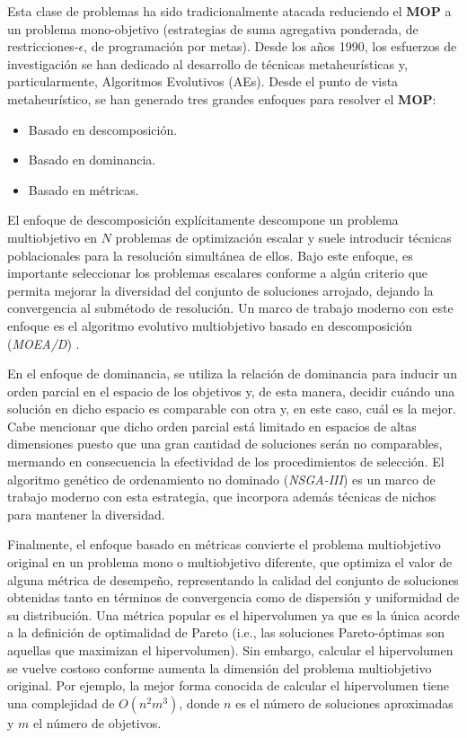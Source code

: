 \documentclass[letterpaper,10pt]{article}
\begin{document}
Esta clase de problemas ha sido tradicionalmente atacada reduciendo el \textbf{MOP} a un problema mono-objetivo (estrategias de suma agregativa ponderada, de restricciones-$\epsilon$,
de programación por metas). Desde los años 1990, los esfuerzos de investigación se han dedicado al desarrollo de técnicas metaheurísticas y, particularmente, Algoritmos Evolutivos (AEs).
Desde el punto de vista metaheurístico, se han generado tres grandes enfoques para resolver el \textbf{MOP}:

\begin{itemize}
 \item Basado en descomposición.
 \item Basado en dominancia.
 \item Basado en métricas.
\end{itemize}

El enfoque de descomposición explícitamente descompone un problema multiobjetivo en $N$ problemas de optimización escalar y suele introducir técnicas poblacionales para
la resolución simultánea de ellos. Bajo este enfoque, es importante seleccionar los problemas escalares conforme a algún criterio que permita mejorar la diversidad del conjunto
de soluciones arrojado, dejando la convergencia al submétodo de resolución. Un marco de trabajo moderno con este enfoque es el algoritmo evolutivo multiobjetivo basado en
descomposición (\emph{MOEA/D}) \cite{4358754}.
\newline

En el enfoque de dominancia, se utiliza la relación de dominancia para inducir un orden parcial en el espacio de los objetivos y, de esta manera, decidir cuándo una solución
en dicho espacio es comparable con otra y, en este caso, cuál es la mejor. Cabe mencionar que dicho orden parcial está limitado en espacios de altas dimensiones puesto que una gran
cantidad de soluciones serán no comparables, mermando en consecuencia la efectividad de los procedimientos de selección. El algoritmo genético de ordenamiento no dominado
(\emph{NSGA-III}) \cite{6600851} es un marco de trabajo moderno con esta estrategia, que incorpora además técnicas de nichos para mantener la diversidad.
\newline

Finalmente, el enfoque basado en métricas convierte el problema multiobjetivo original en un problema mono o multiobjetivo diferente, que optimiza el valor de alguna métrica de desempeño,
representando la calidad del conjunto de soluciones obtenidas tanto en términos de convergencia como de dispersión y uniformidad de su distribución. Una métrica popular
es el hipervolumen ya que es la única acorde a la definición de  optimalidad de Pareto (i.e., las soluciones Pareto-óptimas son aquellas que maximizan el hipervolumen).
Sin embargo, calcular el hipervolumen se vuelve costoso conforme aumenta la dimensión del problema multiobjetivo original. Por ejemplo, la mejor forma conocida de calcular
el hipervolumen tiene una complejidad de $O(n^2m^3)$, donde $n$ es el número de soluciones aproximadas y $m$ el número de objetivos.
\newline
\end{document}
